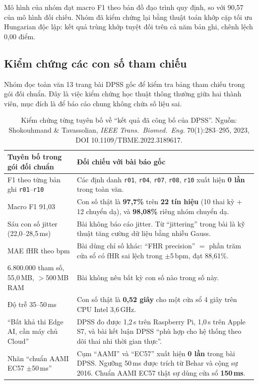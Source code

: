 Mô hình của nhóm đạt macro F1  theo bản đồ đạo trình quy định, so với 90,57 của mô hình đối
chiếu. Nhóm đã kiểm chứng lại bằng thuật toán khớp cặp tối ưu Hungarian độc lập: kết quả trùng khớp
tuyệt đối trên cả năm bản ghi, chênh lệch 0,00 điểm.

\subsection{Kiểm chứng các con số tham chiếu}

Nhóm đọc toàn văn 13 trang bài DPSS gốc để kiểm tra bảng tham chiếu trong gói đối chuẩn. Đây là việc
kiểm chứng học thuật thông thường giữa hai thành viên, mục đích là để báo cáo chung không chứa số liệu
sai.

\begin{table}[H]\centering\small
\caption{Kiểm chứng từng tuyên bố về ``kết quả đã công bố của DPSS''. Nguồn: Shokouhmand \& Tavassolian,
\textit{IEEE Trans.\ Biomed.\ Eng.} 70(1):283--295, 2023, DOI 10.1109/TBME.2022.3189617.}
\label{tab:kiemchung}
\begin{tabular}{@{}L{5.4cm} L{9.0cm}@{}}
\toprule
\textbf{Tuyên bố trong gói đối chuẩn} & \textbf{Đối chiếu với bài báo gốc} \\
\midrule
F1 theo từng bản ghi \texttt{r01}--\texttt{r10} &  Các định danh \texttt{r01},
\texttt{r04}, \texttt{r07}, \texttt{r08}, \texttt{r10} xuất hiện \textbf{0 lần} trong toàn văn. \\
Macro F1 91,03 &  Con số thật là \textbf{97,7\%} trên \textbf{22 tín hiệu}
(10 thai kỳ + 12 chuyển dạ), và \textbf{98,08\%} riêng nhóm chuyển dạ. \\
Sáu con số jitter (22,0--28,5\,ms) &  Bài không báo cáo jitter. Từ ``jittering''
trong bài là kỹ thuật tăng cường dữ liệu bằng nhiễu Gauss. \\
MAE fHR theo bpm &  Bài dùng chỉ số khác: ``FHR precision'' $=$ phần trăm cửa sổ có
fHR sai lệch trong $\pm$5\,bpm, đạt 88,61\%. \\
6.800.000 tham số, 55,0\,MB, $>$500\,MB RAM &  Bài không nêu bất kỳ con số nào
trong số này. \\
Độ trễ 35--50\,ms &  Con số thật là \textbf{0,52 giây} cho một cửa sổ 4 giây trên CPU Intel
3,6\,GHz. \\
``Bất khả thi Edge AI, cần máy chủ Cloud'' &  DPSS đo được 1,2\,s trên
Raspberry Pi, 1,0\,s trên Apple S7, và bài kết luận DPSS ``phù hợp cho hệ thống theo dõi thai nhi thời
gian thực''. \\
Nhãn ``chuẩn AAMI EC57 $\pm$50\,ms'' &  Cụm ``AAMI'' và ``EC57'' xuất hiện \textbf{0 lần}
trong bài DPSS. Ngưỡng 50\,ms được trích từ Behar và cộng sự 2016. Chuẩn AAMI EC57 thật sự dùng cửa sổ
\textbf{150\,ms}. \\
\bottomrule
\end{tabular}
\end{table}

